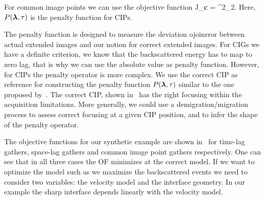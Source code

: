 For common image points we can use the objective function
\beq
J_{\bf c} =   ^2_2.
\eeq
%
Here, $P({\boldsymbol{\lambda}},\tau)$ is the penalty function for CIPs.

The penalty function is designed to measure the deviation ojoinrror between actual extended images and our notion for correct 
extended images. For CIGs we have a definite criterion, we know that the backscattered energy has to map
to zero lag, that is why we can use the absolute value as penalty function. However, for CIPs the 
penalty operator is more complex. We use the correct CIP as reference for constructing the penalty function $P({\boldsymbol{\lambda}},\tau)$ similar
to the one proposed by~\citep{tony:cwp12}. The correct CIP, shown in~ has the right focusing within the acquisition limitations.
More generally, we could use a demigration/migration process to assess correct focusing at a given CIP position, and to infer the shape of 
the penalty operator.

The objective functions for our synthetic example are shown in~ for time-lag gathers, space-lag gathers and
common image point gathers respectively. One can see that in all three cases the OF minimizes at the correct model. If we want to optimize the model such as 
we maximize the backscattered events we need to consider two variables: the velocity model and the interface geometry. 
 In our example the sharp interface depends linearly with the velocity model.



